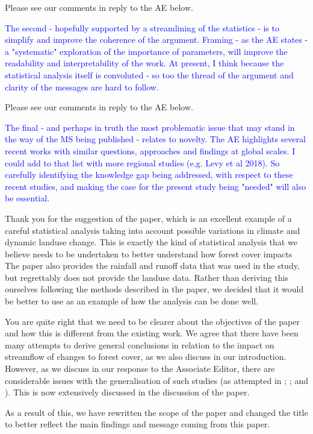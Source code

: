 \documentclass[]{elsarticle} %
\begin{document}
Please see our comments in reply to the AE below.

\textcolor{blue}{The second - hopefully supported by a streamlining of the statistics - is to simplify and improve the coherence of the argument.  Framing - as the AE states - a "systematic" exploration of the importance of parameters, will improve the readability and interpretability of the work.  At present, I think because the statistical analysis itself is convoluted - so too the thread of the argument and clarity of the messages are hard to follow.}

Please see our comments in reply to the AE below.

\textcolor{blue}{The final - and perhaps in truth the most problematic issue that may stand in the way of the MS being published - relates to novelty.  The AE highlights several recent works with similar questions, approaches and findings at global scales.  I could add to that list with more regional studies (e.g. Levy et al 2018).  So carefully identifying the knowledge gap being addressed, with respect to these recent studies, and making the case for the present study being "needed" will also be essential.}

Thank you for the suggestion of the \citet{levy2018} paper, which is an excellent example of a careful statistical analysis taking into account possible variations in climate and dynamic landuse change. This is exactly the kind of statistical analysis that we believe needs to be undertaken to better understand how forest cover impacts The paper also provides the rainfall and runoff data that was used in the study, but regrettably does not provide the landuse data. Rather than deriving this ourselves following the methods described in the paper, we decided that it would be better to use \citet{levy2018} as an example of how the analysis can be done well.

You are quite right that we need to be clearer about the objectives of the paper and how this is different from the existing work. We agree that there have been many attempts to derive general conclusions in relation to the impact on streamflow of changes to forest cover, as we also discuss in our introduction. However, as we discuss in our response to the Associate Editor, there are considerable issues with the generalisation of such studies (as attempted in \citet{zhou2015}; \citet{jackson2005}; \citet{filoso2017} and \citet{zhang2017}). This is now extensively discussed in the discussion of the paper.

As a result of this, we have rewritten the scope of the paper and changed the title to better reflect the main findings and message coming from this paper.
\end{document}
